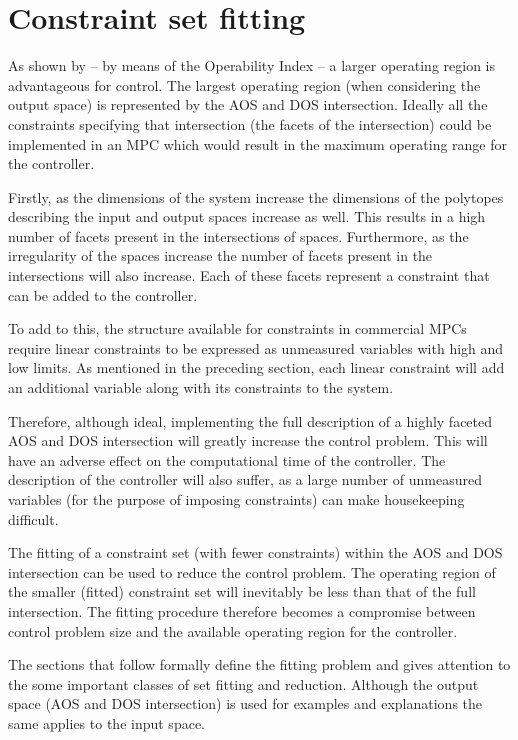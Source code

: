 \section{Constraint set fitting}
As shown by \citet{vinsonphd} -- by means of the Operability Index -- a larger operating region is advantageous for control.
The largest operating region (when considering the output space) is represented by the AOS and DOS intersection.
Ideally all the constraints specifying that intersection (the facets of the intersection) could be implemented in an MPC which would result in the maximum operating range for the controller.

Firstly, as the dimensions of the system increase the dimensions of the polytopes describing the input and output spaces increase as well.
This results in a high number of facets present in the intersections of spaces.
Furthermore, as the irregularity of the spaces increase the number of facets present in the intersections will also increase.
Each of these facets represent a constraint that can be added to the controller.

To add to this, the structure available for constraints in commercial MPCs require linear constraints to be expressed as unmeasured variables with high and low limits.
As mentioned in the preceding section, each linear constraint will add an additional variable along with its constraints to the system.

Therefore, although ideal, implementing the full description of a highly faceted AOS and DOS intersection will greatly increase the control problem.
This will have an adverse effect on the computational time of the controller.
The description of the controller will also suffer, as a large number of unmeasured variables (for the purpose of imposing constraints) can make housekeeping difficult.

The fitting of a constraint set (with fewer constraints) within the AOS and DOS intersection can be used to reduce the control problem.
The operating region of the smaller (fitted) constraint set will inevitably be less than that of the full intersection.
The fitting procedure therefore becomes a compromise between control problem size and the available operating region for the controller.

The sections that follow formally define the fitting problem and gives attention to the some important classes of set fitting and reduction.
Although the output space (AOS and DOS intersection) is used for examples and explanations the same applies to the input space.

